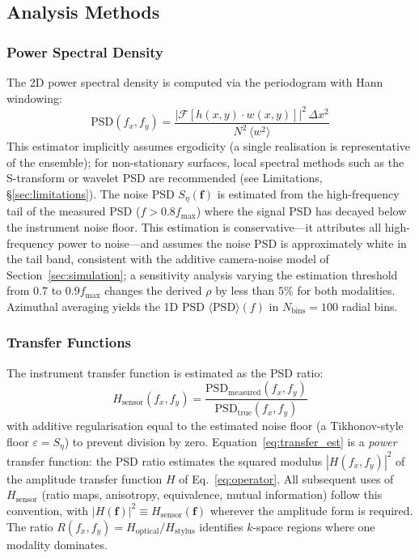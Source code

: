 \documentclass[review,12pt]{elsarticle}
\begin{document}
\subsection{Analysis Methods}
\label{sec:analysis}

\subsubsection{Power Spectral Density}

The 2D power spectral density is computed via the periodogram with Hann windowing:
\begin{equation}
    \mathrm{PSD}(f_x,f_y) = \frac{|\mathcal{F}[h(x,y) \cdot w(x,y)]|^2 \, \Delta x^2}{N^2 \, \langle w^2 \rangle}
    \label{eq:psd}
\end{equation}
This estimator implicitly assumes ergodicity (a single realisation is representative of the ensemble); for non-stationary surfaces, local spectral methods such as the S-transform or wavelet PSD are recommended (see Limitations, \S\ref{sec:limitations}). The noise PSD $S_\eta(\mathbf{f})$ is estimated from the high-frequency tail of the measured PSD ($f > 0.8 f_\mathrm{max}$) where the signal PSD has decayed below the instrument noise floor. This estimation is conservative---it attributes all high-frequency power to noise---and assumes the noise PSD is approximately white in the tail band, consistent with the additive camera-noise model of Section~\ref{sec:simulation}; a sensitivity analysis varying the estimation threshold from $0.7$ to $0.9 f_\mathrm{max}$ changes the derived $\rho$ by less than $5\%$ for both modalities.
Azimuthal averaging yields the 1D PSD $\langle\mathrm{PSD}\rangle(f)$ in $N_\mathrm{bins}=100$ radial bins.

\subsubsection{Transfer Functions}

The instrument transfer function is estimated as the PSD ratio:
\begin{equation}
    H_\mathrm{sensor}(f_x,f_y) = \frac{\mathrm{PSD}_\mathrm{measured}(f_x,f_y)}{\mathrm{PSD}_\mathrm{true}(f_x,f_y)}
    \label{eq:transfer_est}
\end{equation}
with additive regularisation equal to the estimated noise floor (a Tikhonov-style floor $\varepsilon = S_\eta$) to prevent division by zero. Equation~\ref{eq:transfer_est} is a \emph{power} transfer function: the PSD ratio estimates the squared modulus $|H(f_x,f_y)|^2$ of the amplitude transfer function $H$ of Eq.~\ref{eq:operator}. All subsequent uses of $H_\mathrm{sensor}$ (ratio maps, anisotropy, equivalence, mutual information) follow this convention, with $|H(\mathbf{f})|^2 \equiv H_\mathrm{sensor}(\mathbf{f})$ wherever the amplitude form is required. The ratio $ R(f_x,f_y) = H_\mathrm{optical}/H_\mathrm{stylus}$ identifies $k$-space regions where one modality dominates.
\end{document}
